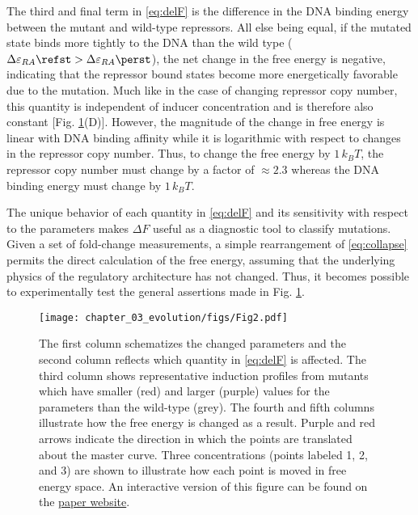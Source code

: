 The third and final term in \eqref{eq:delF} is the difference
in the DNA binding energy between the mutant and wild-type repressors. All else
being equal, if the
mutated state binds more tightly to the DNA than the wild type
($\Delta\varepsilon_{RA}\refst > \Delta\varepsilon_{RA}\perst$), the net change
in the free energy is negative, indicating that the repressor bound states
become more energetically favorable due to the mutation.
Much like in the case of changing repressor copy number, this quantity
is independent of inducer concentration and is therefore also constant
[Fig. \ref{fig:deltaF_theory}(D)]. However, the
magnitude of the change in free energy is linear with DNA binding affinity 
while it is logarithmic with respect to changes in the repressor copy number. Thus, to
change the free energy by $1\, k_BT$, the repressor copy number must change
by a factor of $\approx 2.3$ whereas the DNA binding energy must change by $1\, k_BT$. 

The unique behavior of each quantity in \eqref{eq:delF} and its sensitivity with
respect to the parameters makes $\Delta F$ useful as a diagnostic tool to classify
mutations. Given a set of fold-change measurements, a simple rearrangement of
\eqref{eq:collapse} permits the direct calculation of the free energy, assuming
that the underlying physics of the regulatory architecture has not changed. Thus,
it becomes possible to experimentally test the general assertions made in Fig.
\ref{fig:deltaF_theory}.

\begin{figure}[t]
        \centering
        \texttt{[image: chapter\_03\_evolution/figs/Fig2.pdf]}
    \caption[Parametric changes due to mutations alter the free energy.]{The first column schematizes
    the changed parameters and the second column reflects which quantity in
    \eqref{eq:delF} is affected. The third column shows representative induction
    profiles from mutants which have smaller (red) and larger (purple) values for
    the parameters than the wild-type (grey). The fourth and fifth columns illustrate how the
    free energy is changed as a result. Purple and red arrows indicate the direction
    in which the points are translated about the master curve. Three concentrations
    (points labeled 1, 2, and 3) are shown  to illustrate how each point is
    moved in free energy space. An interactive version of this figure can be
    found on the \href{http://rpgroup.caltech.edu/mwc_mutants}{paper website}.}
    \label{fig:deltaF_theory}
\end{figure}
    
